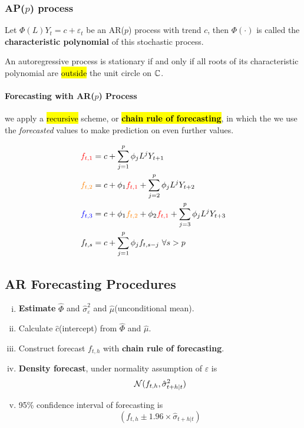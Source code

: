 \documentclass[11pt]{article}
\begin{document}
		\subsubsection{AP($p$) process}
			\begin{definition}
				Let $\Phi(L)Y_t = c + \varepsilon_t$ be an AR($p$) process with trend $c$, then $\Phi(\cdot)$ is called the \textbf{characteristic polynomial} of this stochastic process.
			\end{definition}
			
			\begin{theorem}
				An autoregressive process is stationary if and only if all roots of its characteristic polynomial are \hl{outside} the unit circle on $\mathbb{C}$.
			\end{theorem}
			
			\paragraph{Forecasting with AR($p$) Process} we apply a \hl{recursive} scheme, or \hl{\textbf{chain rule of forecasting}}, in which the we use the \emph{forecasted} values to make prediction on even further values.
			\begin{example}
				\begin{align}
					\red{f_{t,1}} &= c + \sum_{j=1}^p \phi_j L^j Y_{t+1} \\
					\orange{f_{t,2}} &= c + \phi_1 \red{f_{t,1}} + \sum_{j=2}^p \phi_j L^j Y_{t+2} \\
					\blue{f_{t,3}} &= c + \phi_1 \orange{f_{t,2}} + \phi_2 \red{f_{t,1}} + \sum_{j=3}^p \phi_j L^j Y_{t+3}\\
					f_{t, s} &= c + \sum_{j=1}^p \phi_j f_{t, s-j}\ \forall s > p
				\end{align}
			\end{example}
		
		\subsection{AR Forecasting Procedures}
			\begin{enumerate}[(i)]
				\item \textbf{Estimate} $\hat{\Phi}$ and $\hat{\sigma}_\varepsilon^2$ and $\hat{\mu}$(unconditional mean). 
				\item Calculate $\hat{c}$(intercept) from $\hat{\Phi}$ and $\hat{\mu}$.
				\item Construct forecast $f_{t, h}$ with \textbf{chain rule of forecasting}.
				\item \textbf{Density forecast}, under normality assumption of $\varepsilon$ is
				\begin{equation}
					\mathcal{{N}}(f_{t,h}, \hat{\sigma}^2_{t+h|t})
				\end{equation}
				\item 95\% confidence interval of forecasting is
				\begin{equation}
					(f_{t,h} \pm 1.96 \times \hat{\sigma}_{t+h|t})
				\end{equation}
			\end{enumerate}
		
\end{document}
